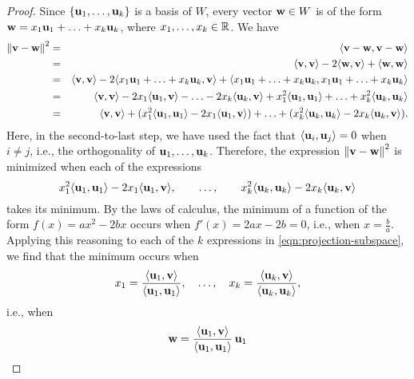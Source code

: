 \begin{proof}
  Since $\set{\vect{u}_1,\ldots,\vect{u}_k}$ is a basis of $W$, every
  vector $\vect{w}\in W$ is of the form
  $\vect{w} = x_1\vect{u}_1 + \ldots + x_k\vect{u}_k$, where
  $x_1,\ldots,x_k\in\mathbb{R}$. We have
  \begin{eqnarray*}
    \norm{\vect{v}-\vect{w}}^2
    &=& \iprod{\vect{v}-\vect{w}, \vect{v}-\vect{w}} \\
    &=& \iprod{\vect{v}, \vect{v}} - 2\iprod{\vect{w},\vect{v}} + \iprod{\vect{w},\vect{w}} \\
    &=& \iprod{\vect{v}, \vect{v}} - 2\iprod{x_1\vect{u}_1 + \ldots + x_k\vect{u}_k,\vect{v}} + \iprod{x_1\vect{u}_1 + \ldots + x_k\vect{u}_k, x_1\vect{u}_1 + \ldots + x_k\vect{u}_k} \\
    &=& \iprod{\vect{v}, \vect{v}} - 2x_1\iprod{\vect{u}_1,\vect{v}} - \ldots - 2x_k\iprod{\vect{u}_k,\vect{v}} + x_1^2\iprod{\vect{u}_1, \vect{u}_1} + \ldots + x_k^2\iprod{\vect{u}_k, \vect{u}_k} \\
    &=& \iprod{\vect{v}, \vect{v}} + (x_1^2\iprod{\vect{u}_1, \vect{u}_1} - 2x_1\iprod{\vect{u}_1,\vect{v}}) + \ldots + (x_k^2\iprod{\vect{u}_k, \vect{u}_k} - 2x_k\iprod{\vect{u}_k,\vect{v}}).
  \end{eqnarray*}
  Here, in the second-to-last step, we have used the fact that
  $\iprod{\vect{u}_i,\vect{u}_j}=0$ when $i\neq j$, i.e., the
  orthogonality of $\vect{u}_1,\ldots,\vect{u}_k$.  Therefore, the
  expression $\norm{\vect{v}-\vect{w}}^2$ is minimized when each of the
  expressions
  \begin{equation}\label{eqn:projection-subspace}
    x_1^2\iprod{\vect{u}_1, \vect{u}_1} - 2x_1\iprod{\vect{u}_1,\vect{v}}, \qquad
    \ldots,\qquad
    x_k^2\iprod{\vect{u}_k, \vect{u}_k} - 2x_k\iprod{\vect{u}_k,\vect{v}}
  \end{equation}
  takes its minimum. By the laws of calculus, the minimum of a
  function of the form $f(x)=ax^2-2bx$ occurs when $f'(x)=2ax-2b=0$,
  i.e., when $x=\frac{b}{a}$. Applying this reasoning to each of the
  $k$ expressions in {\eqref{eqn:projection-subspace}}, we find that the
  minimum occurs when
  \begin{equation*}
    x_1 = \frac{\iprod{\vect{u}_1,\vect{v}}}{\iprod{\vect{u}_1,\vect{u}_1}},\quad
    \ldots,\quad
    x_k = \frac{\iprod{\vect{u}_k,\vect{v}}}{\iprod{\vect{u}_k,\vect{u}_k}},
  \end{equation*}
  i.e., when
  \begin{equation*}
    \vect{w} =
    \frac{\iprod{\vect{u}_1,\vect{v}}}{\iprod{\vect{u}_1,\vect{u}_1}}\,\vect{u}_1

\end{equation*}
\end{proof}
